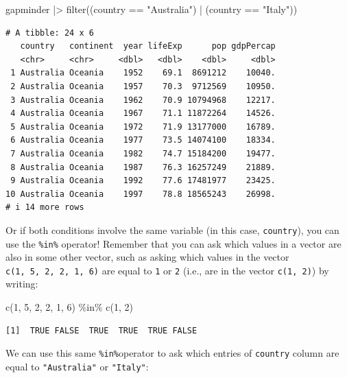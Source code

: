 \documentclass[
  letterpaper,
  DIV=11,
  numbers=noendperiod]{scrreprt}
\newenvironment{Shaded}{\begin{snugshade}}{\end{snugshade}}
\newcommand{\DecValTok}[1]{\textcolor[rgb]{0.68,0.00,0.00}{#1}}
\newcommand{\FunctionTok}[1]{\textcolor[rgb]{0.28,0.35,0.67}{#1}}
\newcommand{\NormalTok}[1]{\textcolor[rgb]{0.00,0.23,0.31}{#1}}
\newcommand{\SpecialCharTok}[1]{\textcolor[rgb]{0.37,0.37,0.37}{#1}}
\newcommand{\StringTok}[1]{\textcolor[rgb]{0.13,0.47,0.30}{#1}}
\begin{document}
\begin{Shaded}
\begin{Highlighting}[]
\NormalTok{gapminder }\SpecialCharTok{|\textgreater{}} \FunctionTok{filter}\NormalTok{((country }\SpecialCharTok{==} \StringTok{"Australia"}\NormalTok{) }\SpecialCharTok{|}\NormalTok{ (country }\SpecialCharTok{==} \StringTok{"Italy"}\NormalTok{))}
\end{Highlighting}
\end{Shaded}

\begin{verbatim}
# A tibble: 24 x 6
   country   continent  year lifeExp      pop gdpPercap
   <chr>     <chr>     <dbl>   <dbl>    <dbl>     <dbl>
 1 Australia Oceania    1952    69.1  8691212    10040.
 2 Australia Oceania    1957    70.3  9712569    10950.
 3 Australia Oceania    1962    70.9 10794968    12217.
 4 Australia Oceania    1967    71.1 11872264    14526.
 5 Australia Oceania    1972    71.9 13177000    16789.
 6 Australia Oceania    1977    73.5 14074100    18334.
 7 Australia Oceania    1982    74.7 15184200    19477.
 8 Australia Oceania    1987    76.3 16257249    21889.
 9 Australia Oceania    1992    77.6 17481977    23425.
10 Australia Oceania    1997    78.8 18565243    26998.
# i 14 more rows
\end{verbatim}

Or if both conditions involve the same variable (in this case,
\texttt{country}), you can use the \texttt{\%in\%} operator! Remember
that you can ask which values in a vector are also in some other vector,
such as asking which values in the vector
\texttt{c(1,\ 5,\ 2,\ 2,\ 1,\ 6)} are equal to \texttt{1} or \texttt{2}
(i.e., are in the vector \texttt{c(1,\ 2)}) by writing:

\begin{Shaded}
\begin{Highlighting}[]
\FunctionTok{c}\NormalTok{(}\DecValTok{1}\NormalTok{, }\DecValTok{5}\NormalTok{, }\DecValTok{2}\NormalTok{, }\DecValTok{2}\NormalTok{, }\DecValTok{1}\NormalTok{, }\DecValTok{6}\NormalTok{) }\SpecialCharTok{\%in\%} \FunctionTok{c}\NormalTok{(}\DecValTok{1}\NormalTok{, }\DecValTok{2}\NormalTok{)}
\end{Highlighting}
\end{Shaded}

\begin{verbatim}
[1]  TRUE FALSE  TRUE  TRUE  TRUE FALSE
\end{verbatim}

We can use this same \texttt{\%in\%}operator to ask which entries of
\texttt{country} column are equal to \texttt{"Australia"} or
\texttt{"Italy"}:
\end{document}
